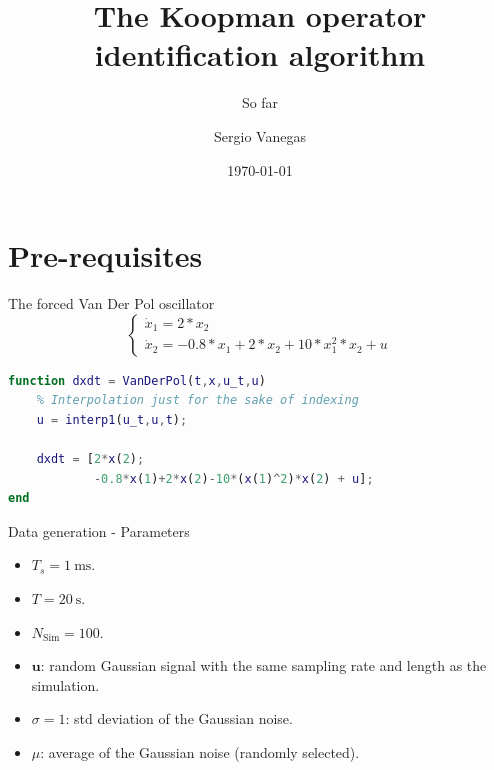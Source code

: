 \documentclass{beamer}
\title[Process]{The Koopman operator identification algorithm}
\subtitle{So far}
\institute[Polimi]{Politecnico di Milano}
\author{Sergio Vanegas}
\date{\today}
\begin{document}
\begin{frame}
    \maketitle
\end{frame}


\section{Pre-requisites}

\begin{frame}[fragile]{The forced Van Der Pol oscillator}
    \begin{equation}
        \begin{cases}
            \dot{x}_1 = 2*x_2 \\
            \dot{x}_2 = -0.8*x_1 + 2*x_2 + 10*x_1^2*x_2 + u
        \end{cases}
    \end{equation}

    \begin{lstlisting}[language=Matlab]
function dxdt = VanDerPol(t,x,u_t,u)
    % Interpolation just for the sake of indexing
    u = interp1(u_t,u,t);

    dxdt = [2*x(2);
            -0.8*x(1)+2*x(2)-10*(x(1)^2)*x(2) + u];
end
    \end{lstlisting}
\end{frame}

\begin{frame}{Data generation - Parameters}
    \begin{itemize}
        \item $T_s = \SI{1}{\milli \second}$.
        \item $T = \SI{20}{\second}$.
        \item $N_\text{Sim} = \num{100}$.
        \item $\textbf{u}$: random Gaussian signal with the same sampling rate and length as the simulation.
        \item $\sigma = 1$: std deviation of the Gaussian noise.
        \item $\mu$: average of the Gaussian noise (randomly selected).
    \end{itemize}
\end{frame}
\end{document}

